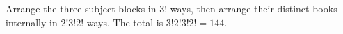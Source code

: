 Arrange the three subject blocks in $3!$ ways, then arrange their distinct books internally in $2!3!2!$ ways. The total is $3!2!3!2!=\boxed{144}$.
